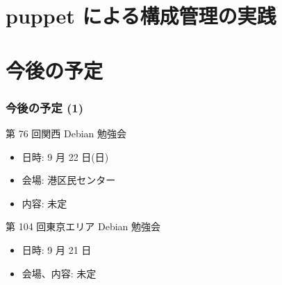 \documentclass[cjk,dvipdfmx,10pt,compress,%
hyperref={bookmarks=true,bookmarksnumbered=true,bookmarksopen=false,%
colorlinks=false,%
pdftitle={第 75 回 関西 Debian 勉強会},%
pdfauthor={倉敷・のがた・佐々木・かわだ・八津尾},%
pdfsubject={資料},%
}]{beamer}
\begin{document}

\section{puppet による構成管理の実践}


\section{今後の予定}
\begin{frame}[fragile]
\frametitle{今後の予定 (1)}

\begin{block}{第 76 回関西 Debian 勉強会}
  \begin{itemize}
  \item 日時: 9 月 22 日(日)
  \item 会場: 港区民センター
  \item 内容: 未定
  \end{itemize}
\end{block}

\begin{block}{第 104 回東京エリア Debian 勉強会}
  \begin{itemize}
  \item 日時: 9 月 21 日
  \item 会場、内容: 未定
  \end{itemize}
\end{block}

\end{frame}

\takahashi[50]{  }
\end{document}
